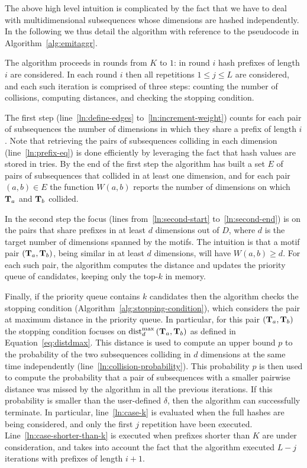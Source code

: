 The above high level intuition is complicated by the fact that we have to deal with multidimensional subsequences whose dimensions are hashed independently. In the following we thus detail the algorithm with reference to the pseudocode in Algorithm~\ref{alg:emitaggr}.

The algorithm proceeds in rounds from $K$ to $1$: in round $i$ hash prefixes of
length $i$ are considered.
In each round $i$ then all repetitions $1\le j \le L$ are considered,
and each such iteration is comprised of three steps:
counting the number of collisions, computing distances, and checking the stopping condition.

The first step (line~\ref{ln:define-edges} to~\ref{ln:increment-weight}) counts for each pair of subsequences the number of dimensions in which they share a prefix of length $i$.
Note that retrieving the pairs of subsequences colliding in each dimension (line~\ref{ln:prefix-eq}) is done efficiently by leveraging the fact that hash values are stored in tries.
By the end of the first step the algorithm has built a set $E$ of pairs of subsequences
that collided in at least one dimension, and for each pair $(a,b) \in E$ the function
$W(a,b)$ reports the number of dimensions on which $\mathbf{T}_{a}$ and $\mathbf{T}_{b}$ collided.

In the second step the focus (lines from~\ref{ln:second-start} to~\ref{ln:second-end})
is on the pairs that share prefixes in at least $d$ dimensions out of $D$, where $d$ is the target number of dimensions spanned by the motifs.
The intuition is that a motif pair $(\mathbf{T}_{a}, \mathbf{T}_{b})$, being similar in at least $d$ dimensions, will have $W(a, b) \ge d$.
For each such pair, the algorithm computes the distance and updates the priority queue of candidates, keeping only the top-$k$ in memory.

Finally, if the priority queue contains $k$ candidates then the algorithm checks the stopping condition (Algorithm~\ref{alg:stopping-condition}), which considers the pair at maximum
distance in the priority queue. In particular, for this pair $(\mathbf{T}_{a}, \mathbf{T}_{b})$ the stopping condition focuses on $\operatorname{dist}^{\max}_{d}\left(\mathbf{T}_{a}, \mathbf{T}_{b}\right)$ as defined in Equation~\eqref{eq:distdmax}.
This distance is used to compute an upper bound $p$ to the probability of the two subsequences colliding in $d$ dimensions at the same time independently (line~\ref{ln:collision-probability}).
This probability $p$ is then used to compute the probability that a pair of subsequences with a smaller pairwise distance was missed by the algorithm in all the previous iterations.
If this probability is smaller than the user-defined $\delta$, then the algorithm can successfully terminate.
In particular, line~\ref{ln:case-k} is evaluated when the full hashes are being considered, and only the first $j$ repetition have been executed.
Line~\ref{ln:case-shorter-than-k} is executed when prefixes shorter than $K$ are under consideration, and takes into account the fact that the algorithm executed $L-j$ iterations with prefixes of length $i+1$.












 




